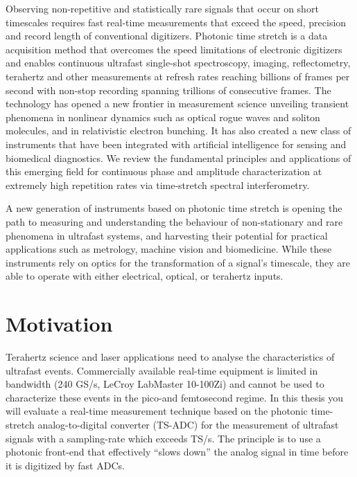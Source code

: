 Observing non-repetitive and statistically rare signals that occur on short timescales requires fast real-time measurements that exceed the speed, precision and record length of conventional digitizers. Photonic time stretch is a data acquisition method that overcomes the speed limitations of electronic digitizers and enables continuous ultrafast single-shot spectroscopy, imaging, reflectometry, terahertz and other measurements at refresh rates reaching billions of frames per second with non-stop recording spanning trillions of consecutive frames. The technology has opened a new frontier in measurement science unveiling transient phenomena in nonlinear dynamics such as optical rogue waves and soliton molecules, and in relativistic electron bunching. It has also created a new class of instruments that have been integrated with artificial intelligence for sensing and biomedical diagnostics. We review the fundamental principles and applications of this emerging field for continuous phase and amplitude characterization at extremely high repetition rates via time-stretch spectral interferometry.

A new generation of instruments based on photonic time stretch is opening the path to measuring and understanding the behaviour of non-stationary and rare phenomena in ultrafast systems, and harvesting their potential for practical applications such as metrology, machine vision and biomedicine. While these instruments rely on optics for the transformation of a signal's timescale, they are able to operate with either electrical, optical, or terahertz inputs.






\section{Motivation}
Terahertz science and laser applications need to analyse the characteristics of ultrafast events. Commercially available real-time equipment is limited in bandwidth (240 GS/s, LeCroy LabMaster 10-100Zi) and cannot be used to characterize these events in the pico-and femtosecond regime. In this thesis you will evaluate a real-time measurement technique based on the photonic time-stretch analog-to-digital converter (TS-ADC) for the measurement of ultrafast signals with a sampling-rate which exceeds TS/s. The principle is to use a photonic front-end that effectively “slows down” the analog signal in time before it is digitized by fast ADCs.




